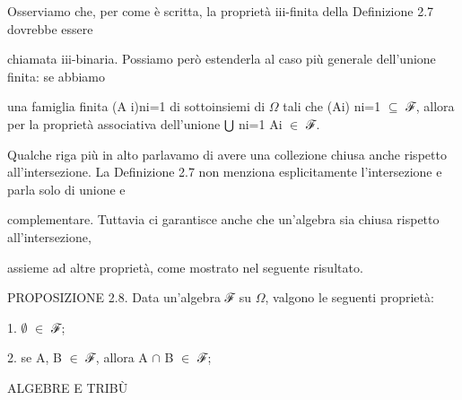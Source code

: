 \documentclass[a4paper,portrait,12pt]{article}
\begin{document}
\begin{flushleft}
Osserviamo che, per come \`{e} scritta, la propriet\`{a} iii-finita della Definizione 2.7 dovrebbe essere
\end{flushleft}


\begin{flushleft}
chiamata iii-binaria. Possiamo per\`{o} estenderla al caso più generale dell'unione finita: se abbiamo
\end{flushleft}


\begin{flushleft}
una famiglia finita (A i)ni=1 di sottoinsiemi di $\Omega$ tali che (Ai) ni=1 $\subseteq$ ℱ, allora per la propriet\`{a} associativa dell'unione ⋃ ni=1 Ai $\in$ ℱ.
\end{flushleft}


\begin{flushleft}
Qualche riga più in alto parlavamo di avere una collezione chiusa anche rispetto all'intersezione. La Definizione 2.7 non menziona esplicitamente l'intersezione e parla solo di unione e
\end{flushleft}


\begin{flushleft}
complementare. Tuttavia ci garantisce anche che un'algebra sia chiusa rispetto all'intersezione,
\end{flushleft}


\begin{flushleft}
assieme ad altre propriet\`{a}, come mostrato nel seguente risultato.
\end{flushleft}


\begin{flushleft}
PROPOSIZIONE 2.8. Data un'algebra ℱ su $\Omega$, valgono le seguenti propriet\`{a}:
\end{flushleft}


\begin{flushleft}
1. $\emptyset$ $\in$ ℱ;
\end{flushleft}


\begin{flushleft}
2. se A, B $\in$ ℱ, allora A $\cap$ B $\in$ ℱ;
\end{flushleft}





\begin{flushleft}
 ALGEBRE E TRIBÙ
\end{flushleft}
\end{document}
